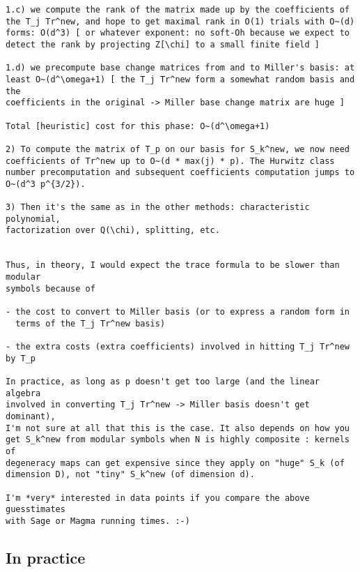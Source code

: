 \documentclass[11pt]{amsart}
\numberwithin{equation}{subsection}
\theoremstyle{definition}
\begin{document}
\begin{verbatim}
1.c) we compute the rank of the matrix made up by the coefficients of
the T_j Tr^new, and hope to get maximal rank in O(1) trials with O~(d)
forms: O(d^3) [ or whatever exponent: no soft-Oh because we expect to
detect the rank by projecting Z[\chi] to a small finite field ]

1.d) we precompute base change matrices from and to Miller's basis: at
least O~(d^\omega+1) [ the T_j Tr^new form a somewhat random basis and the
coefficients in the original -> Miller base change matrix are huge ]

Total [heuristic] cost for this phase: O~(d^\omega+1)

2) To compute the matrix of T_p on our basis for S_k^new, we now need
coefficients of Tr^new up to O~(d * max(j) * p). The Hurwitz class
number precomputation and subsequent coefficients computation jumps to
O~(d^3 p^{3/2}).

3) Then it's the same as in the other methods: characteristic polynomial,
factorization over Q(\chi), splitting, etc.


Thus, in theory, I would expect the trace formula to be slower than modular
symbols because of

- the cost to convert to Miller basis (or to express a random form in
  terms of the T_j Tr^new basis)

- the extra costs (extra coefficients) involved in hitting T_j Tr^new by T_p

In practice, as long as p doesn't get too large (and the linear algebra
involved in converting T_j Tr^new -> Miller basis doesn't get dominant),
I'm not sure at all that this is the case. It also depends on how you
get S_k^new from modular symbols when N is highly composite : kernels of
degeneracy maps can get expensive since they apply on "huge" S_k (of
dimension D), not "tiny" S_k^new (of dimension d).

I'm *very* interested in data points if you compare the above guesstimates
with Sage or Magma running times. :-)
\end{verbatim}

\subsection{In practice}
\end{document}
